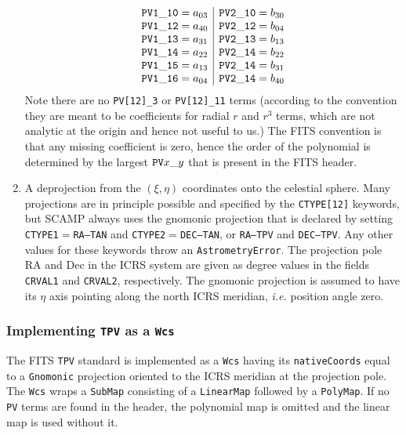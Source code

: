 \documentclass[11pt,preprint,flushrt]{aastex}
\begin{document}
\begin{enumerate}
\begin{equation}
\begin{array}{c|c}
{\tt PV1\_10} = a_{03} & {\tt PV2\_10} = b_{30} \\
{\tt PV1\_12} = a_{40} & {\tt PV2\_12} = b_{04} \\
{\tt PV1\_13} = a_{31} & {\tt PV2\_13} = b_{13} \\
{\tt PV1\_14} = a_{22} & {\tt PV2\_14} = b_{22} \\
{\tt PV1\_15} = a_{13} & {\tt PV2\_14} = b_{31} \\
{\tt PV1\_16} = a_{04} & {\tt PV2\_14} = b_{40}
\end{array}
\end{equation}
Note there are no {\tt PV[12]\_3} or {\tt PV[12]\_11} terms (according to the convention they are meant to be coefficients for radial $r$ and $r^3$ terms, which are not analytic at the origin and hence not useful to us.)  The FITS convention is that any missing coefficient is zero, hence the order of the polynomial is determined by the largest ${\tt PV}x\_y$ that is present in the FITS header.
\item A deprojection from the $(\xi,\eta)$ coordinates onto the celestial sphere.  Many projections are in principle possible and specified by the {\tt CTYPE[12]} keywords, but SCAMP always uses the gnomonic projection that is declared by setting {\tt CTYPE1}$=${\tt RA---TAN} and {\tt CTYPE2}$=${\tt DEC--TAN}, or {\tt RA---TPV} and {\tt DEC--TPV}.  Any other values for these keywords throw an {\tt AstrometryError}.  The projection pole RA and Dec in the ICRS system are given as degree values in the fields {\tt CRVAL1} and {\tt CRVAL2}, respectively.  The gnomonic projection is assumed to have its $\eta$ axis pointing along the north ICRS meridian, {\it i.e.} position angle zero.
\end{enumerate}

\subsubsection{Implementing {\tt TPV} as a {\tt Wcs}}
The FITS {\tt TPV} standard is implemented as a {\tt Wcs} having its {\tt nativeCoords} equal to a {\tt Gnomonic} projection oriented to the ICRS meridian at the projection pole.  The {\tt Wcs} wraps a {\tt SubMap} consisting of a {\tt LinearMap} followed by a {\tt PolyMap}.  
If no {\tt PV} terms are found in the header, the polynomial map is omitted and the linear map is used without it.
\end{document}
